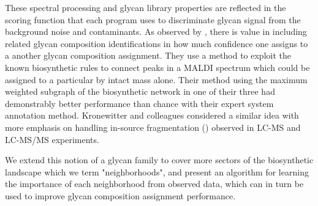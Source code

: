 These spectral processing and glycan library properties are reflected in the
scoring function that each program uses to discriminate glycan signal from
the background noise and contaminants. As observed by \cite{Goldberg2009}, there
is value in including related glycan composition identifications in how much
confidence one assigns to a another glycan composition assignment. They use a method
to exploit the known biosynthetic rules to connect peaks in a MALDI spectrum which
could be assigned to a particular \nglycan by intact mass alone. Their method using
the maximum weighted subgraph of the biosynthetic network in one of their three  had
demonstrably better performance than chance with their expert system annotation method.
Kronewitter and colleagues considered a similar idea with more emphasis on handling
in-source fragmentation (\cite{Kronewitter2014}) observed in LC-MS and LC-MS/MS
experiments.

We extend this notion of a glycan family to cover more sectors of the biosynthetic
landscape which we term "neighborhoods", and present an algorithm for learning the
importance of each neighborhood from observed data, which can in turn be used to
improve glycan composition assignment performance.